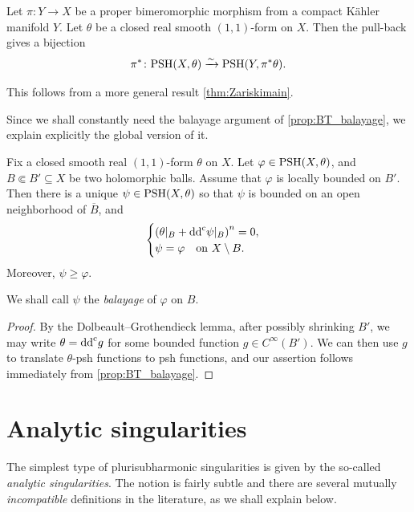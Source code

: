 \begin{proposition}\label{prop:PSHpullbij}
    Let $\pi\colon Y\rightarrow X$ be a proper bimeromorphic morphism from a compact Kähler manifold $Y$. Let $\theta$ be a closed real smooth $(1,1)$-form on $X$. Then the pull-back gives a bijection
    \[
    \pi^*\colon \mathrm{PSH}(X,\theta)\xrightarrow[]{\sim}\mathrm{PSH}(Y,\pi^*\theta).
    \]
\end{proposition}
This follows from a more general result \cref{thm:Zariskimain}.


Since we shall constantly need the balayage argument of \cref{prop:BT_balayage}, we explain explicitly the global version of it.


\begin{proposition}\label{prop:bal_general}
    Fix a closed smooth real $(1,1)$-form $\theta$ on $X$.
    Let $\varphi\in \mathrm{PSH}(X,\theta)$, and $B\Subset B' \subseteq X$ be two holomorphic balls. Assume that $\varphi$ is locally bounded on $B'$. Then there is a unique $\psi \in \mathrm{PSH}(X,\theta)$ so that $\psi$ is bounded on an open neighborhood of $\overline{B}$, and
    \[
    \begin{cases}
        \left( \theta|_B+\mathrm{dd}^{\mathrm{c}} \psi|_B \right)^n = 0,\\
        \psi = \varphi \quad \textup{on } X\setminus B.
    \end{cases}
    \]
    Moreover, $\psi\geq \varphi$.
\end{proposition}
We shall call $\psi$ the \emph{balayage} of $\varphi$ on $B$.
\begin{proof}
    By the Dolbeault--Grothendieck lemma, after possibly shrinking $B'$, we may write $\theta=\mathrm{dd}^{\mathrm{c}} g$ for some bounded function $g\in C^{\infty}(B')$. We can then use $g$ to translate $\theta$-psh functions to psh functions, and our assertion follows immediately from \cref{prop:BT_balayage}.
\end{proof}






\section{Analytic singularities}\label{sec:anasing}

The simplest type of plurisubharmonic singularities is given by the so-called \emph{analytic singularities}.
The notion is fairly subtle and there are several mutually \emph{incompatible} definitions in the literature, as we shall explain below.

